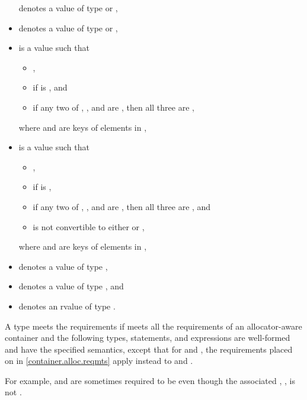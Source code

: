\begin{itemize}
 denotes a value of type  or ,
\item
{} denotes a value of type  or ,
\item
{} is a value such that
  \begin{itemize}
  \item {},
  \item {} if  is , and
  \item if any two of
    , , and 
    are , then all three are ,
  \end{itemize}
  where  and  are keys of elements in ,
\item
{} is a value such that
  \begin{itemize}
  \item {},
  \item {} if  is ,
  \item if any two of
    , , and 
    are , then all three are , and
  \item {} is not convertible to
    either  or ,
  \end{itemize}
  where  and  are keys of elements in ,
\item
{} denotes a value of type ,
\item
{} denotes a value of type , and
\item
{} denotes an rvalue of type .
\end{itemize}

\pnum
A type  meets
the  requirements
if  meets all the requirements of
an allocator-aware container and
the following types, statements, and expressions are well-formed and
have the specified semantics,
except that for  and ,
the requirements placed on  in \ref{container.alloc.reqmts}
apply instead to  and .
\begin{note}
For example,  and 
are sometimes required to be 
even though the associated ,
,
is not .
\end{note}

